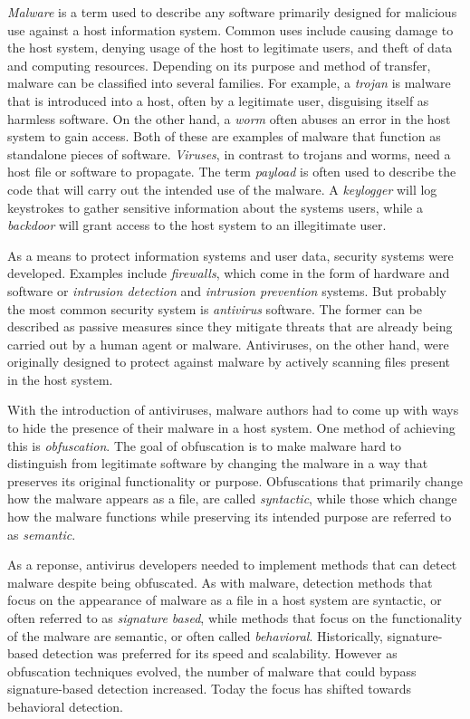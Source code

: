 \emph{Malware} is a term used to describe any software primarily designed for malicious use against a host information system. Common uses include causing damage to the host system, denying usage of the host to legitimate users, and theft of data and computing resources. Depending on its purpose and method of transfer, malware can be classified into several families. For example, a \emph{trojan} is malware that is introduced into a host, often by a legitimate user, disguising itself as harmless software. On the other hand, a \emph{worm} often abuses an error in the host system to gain access. Both of these are examples of malware that function as standalone pieces of software. \emph{Viruses}, in contrast to trojans and worms, need a host file or software to propagate. The term \emph{payload} is often used to describe the code that will carry out the intended use of the malware. A \emph{keylogger} will log keystrokes to gather sensitive information about the systems users, while a \emph{backdoor} will grant access to the host system to an illegitimate user.

As a means to protect information systems and user data, security systems were developed. Examples include \emph{firewalls}, which come in the form of hardware and software or \emph{intrusion detection} and \emph{intrusion prevention} systems. But probably the most common security system is \emph{antivirus} software. The former can be described as passive measures since they mitigate threats that are already being carried out by a human agent or malware. Antiviruses, on the other hand, were originally designed to protect against malware by actively scanning files present in the host system.

With the introduction of antiviruses, malware authors had to come up with ways to hide the presence of their malware in a host system. One method of achieving this is \emph{obfuscation}. The goal of obfuscation is to make malware hard to distinguish from legitimate software by changing the malware in a way that preserves its original functionality or purpose. Obfuscations that primarily change how the malware appears as a file, are called \emph{syntactic}, while those which change how the malware functions while preserving its intended purpose are referred to as \emph{semantic}.

As a reponse, antivirus developers needed to implement methods that can detect malware despite being obfuscated. As with malware, detection methods that focus on the appearance of malware as a file in a host system are syntactic, or often referred to as \emph{signature based}, while methods that focus on the functionality of the malware are semantic, or often called \emph{behavioral}. Historically, signature-based detection was preferred for its speed and scalability. However as obfuscation techniques evolved, the number of malware that could bypass signature-based detection increased. Today the focus has shifted towards behavioral detection.

